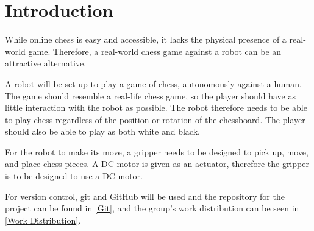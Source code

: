 \section{Introduction}


While online chess is easy and accessible, it lacks the physical presence of a real-world game. Therefore, a real-world chess game against a robot can be an attractive alternative.  

A robot will be set up to play a game of chess, autonomously against a human. The game should resemble a real-life chess game, so the player should have as little interaction with the robot as possible. The robot therefore needs to be able to play chess regardless of the position or rotation of the chessboard. The player should also be able to play as both white and black. 

For the robot to make its move, a gripper needs to be designed to pick up, move, and place chess pieces. A DC-motor is given as an actuator, therefore the gripper is to be designed to use a DC-motor. 

For version control, git and GitHub will be used and the repository for the project can be found in \cref{Git}, and the group's work distribution can be seen in \cref{Work Distribution}.
